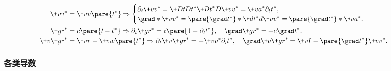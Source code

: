 \documentclass[hidelinks]{ctexart}
\begin{document}
\vspace{-\baselineskip}
\begin{align*}
    \+vv^* &= \+vv\pare{t^*} \Rightarrow \begin{cases}
        \displaystyle \partial_t \+vv^* = \+DtD{t^*} \+D{t^*}D{\+vv^*} = \+va^* \partial_t t^*, \\
        \displaystyle \grad * \+vv^* = \pare{\grad t^*}* \+d{t^*}d{\+vv^*} = \pare{\grad t^*} * \+va^*.
    \end{cases} \\
    {\+gr}^* &= c\pare{t-t^*} \Rightarrow \partial_t \+gr^* = c\pare{1-\partial_t t^*},\quad \grad \+gr^* = -c\grad t^*. \\
    \+v{\+gr}^* &= \+vr - \+vw\pare{t^*} \Rightarrow \partial_t \+v{\+gr}^* = -\+vv^* \partial_t t^*,\quad \grad \+v{\+gr}^* = \+vI - \pare{\grad t^*}\+vv^*.
\end{align*}

\subsubsection{各类导数} %
\label{ssub:各类导数}
\end{document}
